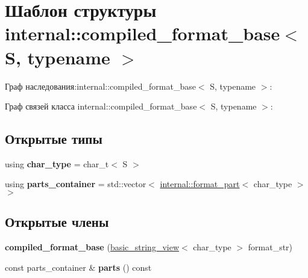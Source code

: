 \hypertarget{structinternal_1_1compiled__format__base}{}\section{Шаблон структуры internal\+:\+:compiled\+\_\+format\+\_\+base$<$ S, typename $>$}
\label{structinternal_1_1compiled__format__base}


Граф наследования\+:internal\+:\+:compiled\+\_\+format\+\_\+base$<$ S, typename $>$\+:


Граф связей класса internal\+:\+:compiled\+\_\+format\+\_\+base$<$ S, typename $>$\+:
\subsection*{Открытые типы}
\begin{DoxyCompactItemize}
\item 
\mbox{\label{structinternal_1_1compiled__format__base_ac33f6ec9204bdbc64afafd97c9276fba}} 
using {\bfseries char\+\_\+type} = char\+\_\+t$<$ S $>$
\item 
\mbox{\label{structinternal_1_1compiled__format__base_a5cc61669a78d19854aeafd9f5a9f2d89}} 
using {\bfseries parts\+\_\+container} = std\+::vector$<$ \hyperlink{structinternal_1_1format__part}{internal\+::format\+\_\+part}$<$ char\+\_\+type $>$ $>$
\end{DoxyCompactItemize}
\subsection*{Открытые члены}
\begin{DoxyCompactItemize}
\item 
\mbox{\label{structinternal_1_1compiled__format__base_a58bb775197653b39979a2f838eee59c6}} 
{\bfseries compiled\+\_\+format\+\_\+base} (\hyperlink{classbasic__string__view}{basic\+\_\+string\+\_\+view}$<$ char\+\_\+type $>$ format\+\_\+str)
\item 
\mbox{\label{structinternal_1_1compiled__format__base_a6c01d40fca6a0cf9dc4ad9484d14cc47}} 
const parts\+\_\+container \& {\bfseries parts} () const
\end{DoxyCompactItemize}
